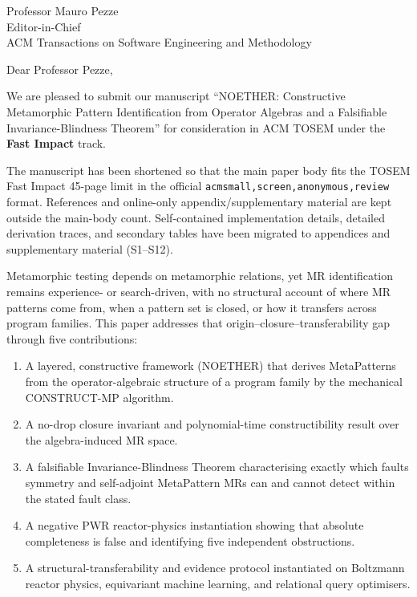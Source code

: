 \documentclass[11pt]{letter}
\begin{document}
\begin{letter}{Professor Mauro Pezze\\
Editor-in-Chief\\
ACM Transactions on Software Engineering and Methodology}

\opening{Dear Professor Pezze,}

We are pleased to submit our manuscript ``NOETHER: Constructive Metamorphic Pattern Identification from Operator Algebras and a Falsifiable Invariance-Blindness Theorem'' for consideration in ACM TOSEM under the \textbf{Fast Impact} track.

The manuscript has been shortened so that the main paper body fits the TOSEM Fast Impact 45-page limit in the official \texttt{acmsmall,screen,anonymous,review} format. References and online-only appendix/supplementary material are kept outside the main-body count. Self-contained implementation details, detailed derivation traces, and secondary tables have been migrated to appendices and supplementary material (S1--S12).

Metamorphic testing depends on metamorphic relations, yet MR identification remains experience- or search-driven, with no structural account of where MR patterns come from, when a pattern set is closed, or how it transfers across program families. This paper addresses that origin--closure--transferability gap through five contributions:

\begin{enumerate}
\item A layered, constructive framework (NOETHER) that derives MetaPatterns from the operator-algebraic structure of a program family by the mechanical CONSTRUCT-MP algorithm.
\item A no-drop closure invariant and polynomial-time constructibility result over the algebra-induced MR space.
\item A falsifiable Invariance-Blindness Theorem characterising exactly which faults symmetry and self-adjoint MetaPattern MRs can and cannot detect within the stated fault class.
\item A negative PWR reactor-physics instantiation showing that absolute completeness is false and identifying five independent obstructions.
\item A structural-transferability and evidence protocol instantiated on Boltzmann reactor physics, equivariant machine learning, and relational query optimisers.
\end{enumerate}


\end{letter}
\end{document}
